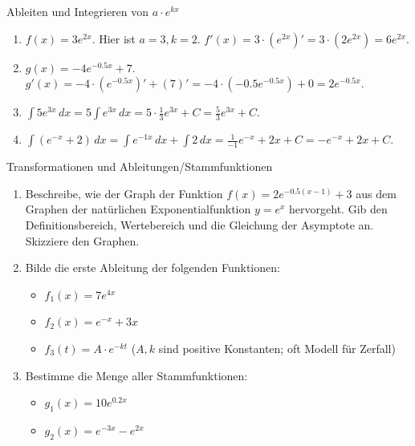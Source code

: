 \begin{beispielumgebung}{Ableiten und Integrieren von $a \cdot e^{kx}$}
\begin{enumerate}
    \item $f(x) = 3e^{2x}$. Hier ist $a=3, k=2$.
        $f'(x) = 3 \cdot (e^{2x})' = 3 \cdot (2e^{2x}) = 6e^{2x}$.
    \item $g(x) = -4e^{-0.5x} + 7$.
        $g'(x) = -4 \cdot (e^{-0.5x})' + (7)' = -4 \cdot (-0.5 e^{-0.5x}) + 0 = 2e^{-0.5x}$.
    \item $\int 5e^{3x} \,dx = 5 \int e^{3x} \,dx = 5 \cdot \frac{1}{3}e^{3x} + C = \frac{5}{3}e^{3x} + C$.
    \item $\int (e^{-x} + 2) \,dx = \int e^{-1x} \,dx + \int 2 \,dx = \frac{1}{-1}e^{-x} + 2x + C = -e^{-x} + 2x + C$.
\end{enumerate}
\end{beispielumgebung}

\begin{aufgabenumgebung}{Transformationen und Ableitungen/Stammfunktionen}
\begin{enumerate}
    \item Beschreibe, wie der Graph der Funktion $f(x) = 2e^{-0.5(x-1)} + 3$ aus dem Graphen der natürlichen Exponentialfunktion $y=e^x$ hervorgeht. Gib den Definitionsbereich, Wertebereich und die Gleichung der Asymptote an. Skizziere den Graphen.
    \item Bilde die erste Ableitung der folgenden Funktionen:
        \begin{itemize}
            \item $f_1(x) = 7e^{4x}$
            \item $f_2(x) = e^{-x} + 3x$
            \item $f_3(t) = A \cdot e^{-kt}$ ($A, k$ sind positive Konstanten; oft Modell für Zerfall)
        \end{itemize}
    \item Bestimme die Menge aller Stammfunktionen:
        \begin{itemize}
            \item $g_1(x) = 10e^{0.2x}$
            \item $g_2(x) = e^{-3x} - e^{2x}$
        \end{itemize}
\end{enumerate}
\end{aufgabenumgebung}



